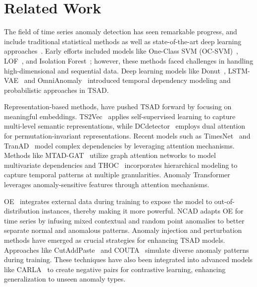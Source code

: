 \section{Related Work}
The field of time series anomaly detection has seen remarkable progress, and include  traditional statistical methods as well as state-of-the-art deep learning approaches~\cite{schmidl2022anomaly,audibert2022deep,darban2024deep}. Early efforts included models like One-Class SVM (OC-SVM)~\cite{scholkopf1999support}, LOF~\cite{breunig2000lof}, and Isolation Forest~\cite{liu2008isolation}; however, these methods faced challenges in handling high-dimensional and sequential data. Deep learning models like Donut~\cite{xu2018donut}, LSTM-VAE~\cite{park2018lstmvae} and OmniAnomaly~\cite{su2019robust} introduced temporal dependency modeling and probabilistic approaches in TSAD.

\sloppy
Representation-based methods, have pushed TSAD forward by focusing on meaningful embeddings. TS2Vec~\cite{yue2022ts2vec} applies self-supervised learning to capture multi-level semantic representations, while DCdetector~\cite{yang2023dcdetector} employs dual attention for permutation-invariant representations. Recent models such as TimesNet~\cite{wu2023timesnet} and TranAD~\cite{tuli2022tranad} model complex dependencies by leveraging attention mechanisms. Methods like MTAD-GAT~\cite{zhao2020mtad} utilize graph attention networks to model multivariate dependencies and THOC~\cite{shen2020thoc} incorporates hierarchical modeling to capture temporal patterns at multiple granularities. Anomaly Transformer~\cite{xu2021anomalytran} leverages anomaly-sensitive features through attention mechanisms.

OE~\cite{hendrycks2018OE} integrates external data during training to expose the model to out-of-distribution instances, thereby making it more powerful. NCAD\cite{ncad2022} adapts OE for time series by infusing mixed contextual and random point anomalies to better separate normal and anomalous patterns.
Anomaly injection and perturbation methods have emerged as crucial strategies for enhancing TSAD models. Approaches like CutAddPaste~\cite{wang2024cutaddpaste} and COUTA~\cite{Calibrated} simulate diverse anomaly patterns during training. These techniques have also been integrated into advanced models like CARLA~\cite{DARBAN2025carla} to create negative pairs for contrastive learning, enhancing generalization to unseen anomaly types.